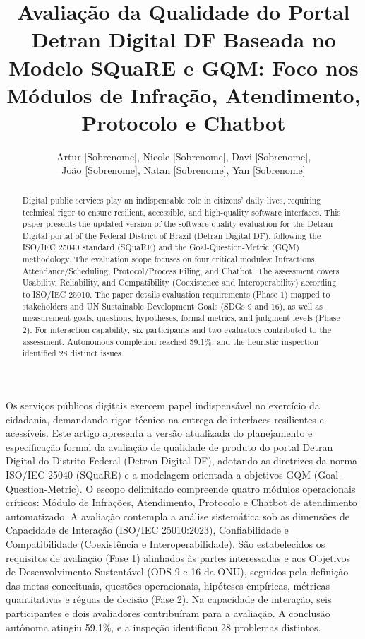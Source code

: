 \documentclass[12pt]{article}
\title{Avaliação da Qualidade do Portal Detran Digital DF Baseada no Modelo SQuaRE e GQM: Foco nos Módulos de Infração, Atendimento, Protocolo e Chatbot}
\author{Artur [Sobrenome]\inst{1}, Nicole [Sobrenome]\inst{1}, Davi [Sobrenome]\inst{1},\\
João [Sobrenome]\inst{1}, Natan [Sobrenome]\inst{1}, Yan [Sobrenome]\inst{1}}
\begin{document}
\maketitle

\begin{abstract}
Digital public services play an indispensable role in citizens' daily lives, requiring technical rigor to ensure resilient, accessible, and high-quality software interfaces. This paper presents the updated version of the software quality evaluation for the Detran Digital portal of the Federal District of Brazil (Detran Digital DF), following the ISO/IEC 25040 standard (SQuaRE) and the Goal-Question-Metric (GQM) methodology. The evaluation scope focuses on four critical modules: Infractions, Attendance/Scheduling, Protocol/Process Filing, and Chatbot. The assessment covers Usability, Reliability, and Compatibility (Coexistence and Interoperability) according to ISO/IEC 25010. The paper details evaluation requirements (Phase 1) mapped to stakeholders and UN Sustainable Development Goals (SDGs 9 and 16), as well as measurement goals, questions, hypotheses, formal metrics, and judgment levels (Phase 2). For interaction capability, six participants and two evaluators contributed to the assessment. Autonomous completion reached 59.1\%, and the heuristic inspection identified 28 distinct issues.
\end{abstract}

\begin{resumo}
Os serviços públicos digitais exercem papel indispensável no exercício da cidadania, demandando rigor técnico na entrega de interfaces resilientes e acessíveis. Este artigo apresenta a versão atualizada do planejamento e especificação formal da avaliação de qualidade de produto do portal Detran Digital do Distrito Federal (Detran Digital DF), adotando as diretrizes da norma ISO/IEC 25040 (SQuaRE) e a modelagem orientada a objetivos GQM (Goal-Question-Metric). O escopo delimitado compreende quatro módulos operacionais críticos: Módulo de Infrações, Atendimento, Protocolo e Chatbot de atendimento automatizado. A avaliação contempla a análise sistemática sob as dimensões de Capacidade de Interação (ISO/IEC 25010:2023), Confiabilidade e Compatibilidade (Coexistência e Interoperabilidade). São estabelecidos os requisitos de avaliação (Fase 1) alinhados às partes interessadas e aos Objetivos de Desenvolvimento Sustentável (ODS 9 e 16 da ONU), seguidos pela definição das metas conceituais, questões operacionais, hipóteses empíricas, métricas quantitativas e réguas de decisão (Fase 2). Na capacidade de interação, seis participantes e dois avaliadores contribuíram para a avaliação. A conclusão autônoma atingiu 59,1\%, e a inspeção identificou 28 problemas distintos.
\end{resumo}
\end{document}
